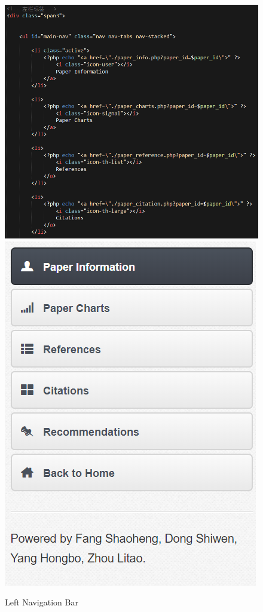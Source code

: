 \documentclass{book}
\begin{document}
\begin{figure}[H]
\centering{}
\includegraphics[scale=0.35]{img/zlt_beau_bar1.png}
\includegraphics[scale=0.35]{img/zlt_beau_bar2.png}
\caption{Left Navigation Bar}
\end{figure}
\end{document}
